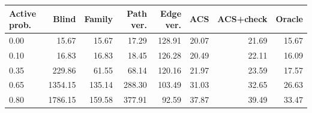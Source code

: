 \begin{tabular}{lrrrrrrr}
\toprule
Active prob. & Blind & Family & Path ver. & Edge ver. & ACS & ACS+check & Oracle \\
\midrule
0.00 & 15.67 & 15.67 & 17.29 & 128.91 & 20.07 & 21.69 & 15.67 \\
0.10 & 16.83 & 16.83 & 18.45 & 126.28 & 20.49 & 22.11 & 16.09 \\
0.35 & 229.86 & 61.55 & 68.14 & 120.16 & 21.97 & 23.59 & 17.57 \\
0.65 & 1354.15 & 135.14 & 288.30 & 103.49 & 31.03 & 32.65 & 26.63 \\
0.80 & 1786.15 & 159.58 & 377.91 & 92.59 & 37.87 & 39.49 & 33.47 \\
\bottomrule
\end{tabular}
